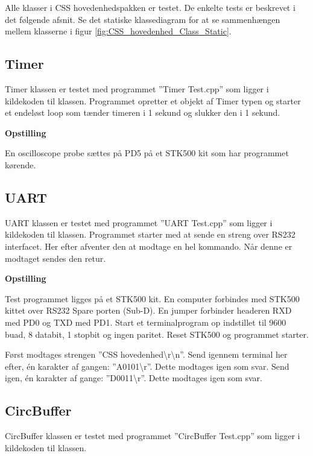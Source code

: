 Alle klasser i CSS hovedenhedspakken er testet. De enkelte tests er beskrevet i det følgende afsnit.
Se det statiske klassediagram for at se sammenhængen mellem klasserne i figur \ref{fig:CSS_hovedenhed_Class_Static}.

\subsection{Timer}
Timer klassen er testet med programmet ''Timer Test.cpp'' som ligger i kildekoden til klassen.
Programmet opretter et objekt af Timer typen og starter et endeløst loop som tænder timeren i 1 sekund og slukker den i 1 sekund.

\textbf{Opstilling}

En oscilloscope probe sættes på PD5 på et STK500 kit som har programmet kørende.




\subsection{UART}
UART klassen er testet med programmet ''UART Test.cpp'' som ligger i kildekoden til klassen.
Programmet starter med at sende en streng over RS232 interfacet. Her efter afventer den at modtage en hel kommando. Når denne er modtaget sendes den retur.

\textbf{Opstilling}

Test programmet ligges på et STK500 kit.
En computer forbindes med STK500 kittet over RS232 Spare porten (Sub-D).
En jumper forbinder headeren RXD med PD0 og TXD med PD1.
Start et terminalprogram op indstillet til 9600 buad, 8 databit, 1 stopbit og ingen paritet.
Reset STK500 og programmet starter.

Først modtages strengen ''CSS hovedenhed\textbackslash r\textbackslash n''.
Send igennem terminal her efter, én karakter af gangen: ''A0101\textbackslash r''. Dette modtages igen som svar.
Send igen, én karakter af gange: ''D0011\textbackslash r''. Dette modtages igen som svar.

\subsection{CircBuffer}
CircBuffer klassen er testet med programmet ''CircBuffer Test.cpp'' som ligger i kildekoden til klassen.


